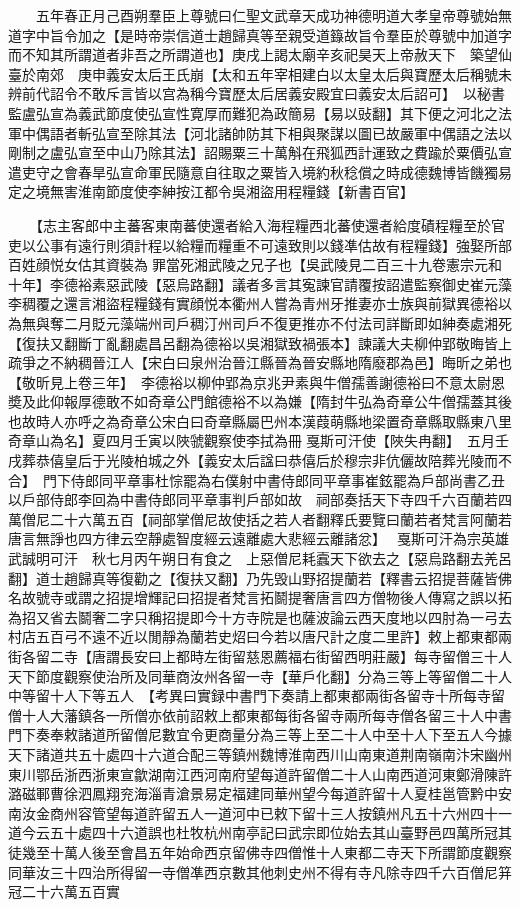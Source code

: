 　　五年春正月己酉朔羣臣上尊號曰仁聖文武章天成功神德明道大孝皇帝尊號始無道字中旨令加之【是時帝崇信道士趙歸真等至親受道籙故旨令羣臣於尊號中加道字而不知其所謂道者非吾之所謂道也】庚戌上謁太廟辛亥祀昊天上帝赦天下　築望仙臺於南郊　庚申義安太后王氏崩【太和五年宰相建白以太皇太后與寶歷太后稱號未辨前代詔令不敢斥言皆以宫為稱今寶歷太后居義安殿宜曰義安太后詔可】　以秘書監盧弘宣為義武節度使弘宣性寛厚而難犯為政簡易【易以䜴翻】其下便之河北之法軍中偶語者斬弘宣至除其法【河北諸帥防其下相與聚謀以圖已故嚴軍中偶語之法以剛制之盧弘宣至中山乃除其法】詔賜粟三十萬斛在飛狐西計運致之費踰於粟價弘宣遣吏守之會春旱弘宣命軍民隨意自往取之粟皆入境約秋稔償之時成德魏博皆饑獨易定之境無害淮南節度使李紳按江都令吳湘盜用程糧錢【新書百官】

　　【志主客郎中主蕃客東南蕃使還者給入海程糧西北蕃使還者給度磧程糧至於官吏以公事有遠行則須計程以給糧而糧重不可遠致則以錢凖估故有程糧錢】強娶所部百姓顔悦女估其資裝為罪當死湘武陵之兄子也【吳武陵見二百三十九卷憲宗元和十年】李德裕素惡武陵【惡烏路翻】議者多言其寃諫官請覆按詔遣監察御史崔元藻李稠覆之還言湘盜程糧錢有實顔悦本衢州人嘗為青州牙推妻亦士族與前獄異德裕以為無與奪二月貶元藻端州司戶稠汀州司戶不復更推亦不付法司詳斷即如紳奏處湘死【復扶又翻斷丁亂翻處昌呂翻為德裕以吳湘獄致禍張本】諫議大夫柳仲郢敬晦皆上疏爭之不納稠晉江人【宋白曰泉州治晉江縣晉為晉安縣地隋廢郡為邑】晦昕之弟也【敬昕見上卷三年】　李德裕以柳仲郢為京兆尹素與牛僧孺善謝德裕曰不意太尉恩奬及此仰報厚德敢不如奇章公門館德裕不以為嫌【隋封牛弘為奇章公牛僧孺蓋其後也故時人亦呼之為奇章公宋白曰奇章縣屬巴州本漢葭萌縣地梁置奇章縣取縣東八里奇章山為名】夏四月壬寅以陜虢觀察使李拭為冊戛斯可汗使【陜失冉翻】　五月壬戌葬恭僖皇后于光陵柏城之外【義安太后諡曰恭僖后於穆宗非伉儷故陪葬光陵而不合】　門下侍郎同平章事杜悰罷為右僕射中書侍郎同平章事崔鉉罷為戶部尚書乙丑以戶部侍郎李回為中書侍郎同平章事判戶部如故　祠部奏括天下寺四千六百蘭若四萬僧尼二十六萬五百【祠部掌僧尼故使括之若人者翻釋氏要覽曰蘭若者梵言阿蘭若唐言無諍也四方律云空靜處智度經云遠離處大悲經云離諸忿】　戛斯可汗為宗英雄武誠明可汗　秋七月丙午朔日有食之　上惡僧尼耗蠧天下欲去之【惡烏路翻去羌呂翻】道士趙歸真等復勸之【復扶又翻】乃先毁山野招提蘭若【釋書云招提菩薩皆佛名故號寺或謂之招提增輝記曰招提者梵言拓鬬提奢唐言四方僧物後人傳寫之誤以拓為招又省去鬬奢二字只稱招提即今十方寺院是也薩波論云西天度地以四肘為一弓去村店五百弓不遠不近以閒靜為蘭若史炤曰今若以唐尺計之度二里許】敕上都東都兩街各留二寺【唐謂長安曰上都時左街留慈恩薦福右街留西明莊嚴】每寺留僧三十人天下節度觀察使治所及同華商汝州各留一寺【華戶化翻】分為三等上等留僧二十人中等留十人下等五人　【考異曰實録中書門下奏請上都東都兩街各留寺十所每寺留僧十人大藩鎮各一所僧亦依前詔敕上都東都每街各留寺兩所每寺僧各留三十人中書門下奏奉敕諸道所留僧尼數宜令更商量分為三等上至二十人中至十人下至五人今據天下諸道共五十處四十六道合配三等鎮州魏博淮南西川山南東道荆南嶺南汴宋幽州東川鄂岳浙西浙東宣歙湖南江西河南府望每道許留僧二十人山南西道河東鄭滑陳許潞磁鄆曹徐泗鳳翔兖海淄青滄景易定福建同華州望今每道許留十人夏桂邕管黔中安南汝金商州容管望每道許留五人一道河中已敕下留十三人按鎮州凡五十六州四十一道今云五十處四十六道誤也杜牧杭州南亭記曰武宗即位始去其山臺野邑四萬所冠其徒幾至十萬人後至會昌五年始命西京留佛寺四僧惟十人東都二寺天下所謂節度觀察同華汝三十四治所得留一寺僧凖西京數其他刺史州不得有寺凡除寺四千六百僧尼䈂冠二十六萬五百實
